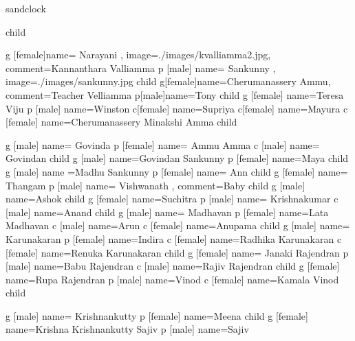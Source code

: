 \documentclass{article}
\begin{document}
\begin{landscape}
\begin{genealogypicture} [
processing=database,
database format=medium marriage below,
node size=2.4cm,
level size=3.5cm,
level distance=6mm,
list separators hang,
name font=\bfseries,
surn code={\textcolor{red!50!black}{#1}},
place text={\newline}{},
date format=d/mon/yyyy,
tcbset={male/.style={colframe=blue,colback=blue!5},
female/.style={colframe=red,colback=red!5}},
box={fit basedim=7pt,boxsep=2pt,segmentation style=solid,
halign=left,before upper=\parskip1pt,
\gtrDBsex,drop fuzzy shadow,
if image defined={add to width=25mm,right=25mm,
underlay={\begin{tcbclipinterior}\path[fill overzoom DBimage]
([xshift=-24mm]interior.south east) rectangle (interior.north east);
\end{tcbclipinterior}},
}{},
},
]

sandclock {
	child {
  		g [female]{name={ Narayani }, image={./images/kvalliamma2.jpg}, comment={Kannanthara Valliamma}}
   		p [male] {name={ Sankunny }, image={./images/sankunny.jpg}}
		child {
  			g[female]{name=Cherumanassery Ammu, comment={Teacher Velliamma}}
   			p[male]{name={Tony }}
   			child {
    				g [female] {name=Teresa Viju }
    				p [male] {name=Winston }
				c[female] {name={Supriya }}
				c[female] {name={Mayura }}
   			}
  		}
		c [female] {name={Cherumanassery Minakshi Amma}}
		child {
			g [male] {name={ Govinda }}
			p [female] {name={ Ammu Amma}}
			c [male] {name={ Govindan }}
			child {
				g [male] {name={Govindan Sankunny}}
				p [female] {name=Maya}
				child {
					g [male] {name ={Madhu Sankunny}}
					p [female] {name={ Ann}}
				}
			}
			child {
				g [female] {name={ Thangam }}
				p [male] {name={ Vishwanath }, comment={Baby}}
				child {
					g [male] {name={Ashok }}
				}
				child {
					g [female] {name={Suchitra }}
					p [male] {name={ Krishnakumar}}
				}
				c [male] {name={Anand }}
			}
			child {
				g [male] {name={ Madhavan}}
				p [female] {name={Lata Madhavan }}
				c [male] {name={Arun }}
				c [female] {name={Anupama }}
			}
			child {
				g [male] {name={ Karunakaran}}
				p [female] {name=Indira}
				c [female] {name={Radhika Karunakaran}}
				c [female] {name={Renuka Karunakaran}}
			}
			child {
				g [female] {name={ Janaki Rajendran}}
				p [male] {name={Babu Rajendran}}
				c [male] {name={Rajiv Rajendran}}
				child {
					g [female] {name={Rupa Rajendran}}
					p [male] {name=Vinod}
					c [female] {name={Kamala Vinod}}
				}
			}
			child {
				g [male] {name={ Krishnankutty}}
				p [female] {name=Meena}
				child {
					g [female] {name={Krishna Krishnankutty Sajiv}}
					p [male] {name=Sajiv}
				}
			
}}}}
\end{genealogypicture}
\end{landscape}
\end{document}
